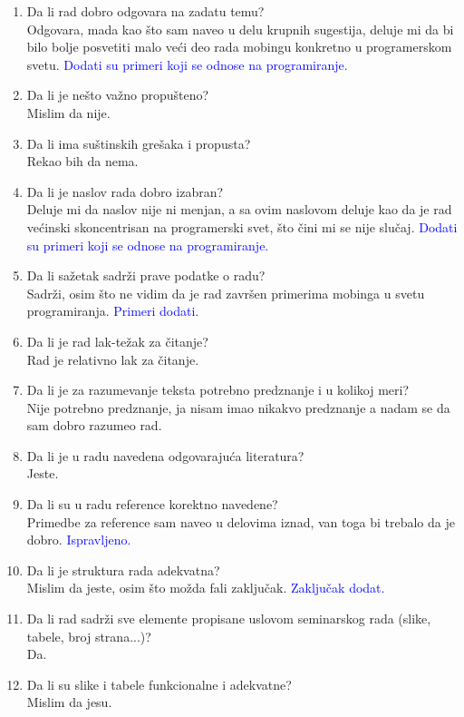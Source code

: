 \documentclass[a4paper]{report}
\newcommand{\odgovor}[1]{\textcolor{blue}{#1}}
\begin{document}
\begin{enumerate}
\item Da li rad dobro odgovara na zadatu temu?\\
Odgovara, mada kao što sam naveo u delu krupnih sugestija, deluje mi da bi bilo bolje posvetiti malo veći deo rada mobingu konkretno u programerskom svetu. \odgovor{Dodati su primeri koji se odnose na programiranje.}
\item Da li je nešto važno propušteno?\\
Mislim da nije.
\item Da li ima suštinskih grešaka i propusta?\\
Rekao bih da nema.
\item Da li je naslov rada dobro izabran?\\
Deluje mi da naslov nije ni menjan, a sa ovim naslovom deluje kao da je rad većinski skoncentrisan na programerski svet, što čini mi se nije slučaj. \odgovor{Dodati su primeri koji se odnose na programiranje.}
\item Da li sažetak sadrži prave podatke o radu?\\
Sadrži, osim što ne vidim da je rad završen primerima mobinga u svetu programiranja. \odgovor{Primeri dodati.}
\item Da li je rad lak-težak za čitanje?\\
Rad je relativno lak za čitanje.
\item Da li je za razumevanje teksta potrebno predznanje i u kolikoj meri?\\
Nije potrebno predznanje, ja nisam imao nikakvo predznanje a nadam se da sam dobro razumeo rad.
\item Da li je u radu navedena odgovarajuća literatura?\\
Jeste.
\item Da li su u radu reference korektno navedene?\\
Primedbe za reference sam naveo u delovima iznad, van toga bi trebalo da je dobro. \odgovor{Ispravljeno.}
\item Da li je struktura rada adekvatna?\\
Mislim da jeste, osim što možda fali zaključak. \odgovor{Zaključak dodat.}
\item Da li rad sadrži sve elemente propisane uslovom seminarskog rada (slike, tabele, broj strana...)?\\
Da.
\item Da li su slike i tabele funkcionalne i adekvatne?\\
Mislim da jesu.
\end{enumerate}
\end{document}
